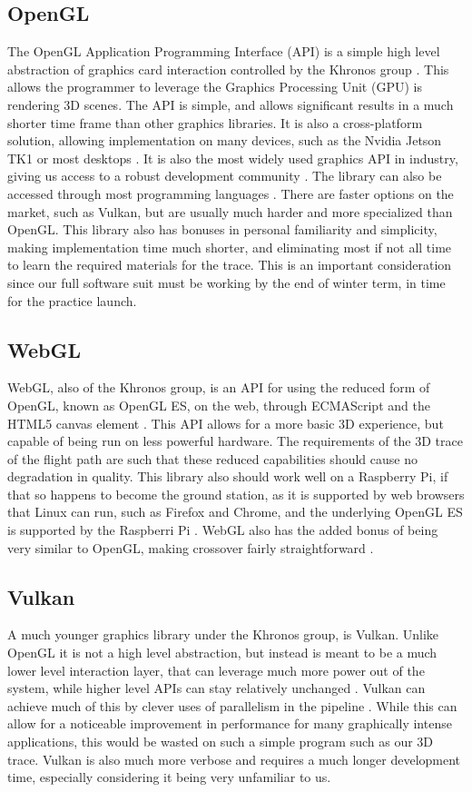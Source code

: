 \documentclass[onecolumn, draftclsnofoot,10pt, compsoc]{IEEEtran}
\begin{document}
\subsection{OpenGL}
The OpenGL Application Programming Interface (API) is a simple high level abstraction of graphics card interaction controlled by the Khronos group \cite{refopengl}. This allows the programmer to leverage the Graphics Processing Unit (GPU) is rendering 3D scenes. The API is simple, and allows significant results in a much shorter time frame than other graphics libraries. It is also a cross-platform solution, allowing implementation on many devices, such as the Nvidia Jetson TK1 or most desktops \cite{refopengl} \cite{refjetson}. It is also the most widely used graphics API in industry, giving us access to a robust development community \cite{refopengl}. The library can also be accessed through most programming languages \cite{refopengl}. There are faster options on the market, such as Vulkan, but are usually much harder and more specialized than OpenGL\cite{refvulkan}. This library also has bonuses in personal familiarity and simplicity, making implementation time much shorter, and eliminating most if not all time to learn the required materials for the trace. This is an important consideration since our full software suit must be working by the end of winter term, in time for the practice launch. 
\subsection{WebGL}
WebGL, also of the Khronos group, is an API for using the reduced form of OpenGL, known as OpenGL ES, on the web, through ECMAScript and the HTML5 canvas element \cite{refwebgl}. This API allows for a more basic 3D experience, but capable of being run on less powerful hardware. The requirements of the 3D trace of the flight path are such that these reduced capabilities should cause no degradation in quality. This library also should work well on a Raspberry Pi, if that so happens to become the ground station, as it is supported by web browsers that Linux can run, such as Firefox and Chrome, and the underlying OpenGL ES is supported by the Raspberri Pi \cite{refwebgl} \cite{refpi}. WebGL also has the added bonus of being very similar to OpenGL, making crossover fairly straightforward \cite{refwebgl}. 
\subsection{Vulkan}
A much younger graphics library under the Khronos group, is Vulkan. Unlike OpenGL it is not a high level abstraction, but instead is meant to be a much lower level interaction layer, that can leverage much more power out of the system, while higher level APIs can stay relatively unchanged \cite{refvulkan}. Vulkan can achieve much of this by clever uses of parallelism in the pipeline \cite{refvulkan}. While this can allow for a noticeable improvement in performance for many graphically intense applications, this would be wasted on such a simple program such as our 3D trace. Vulkan is also much more verbose and requires a much longer development time, especially considering it being very unfamiliar to us. 
\end{document}
